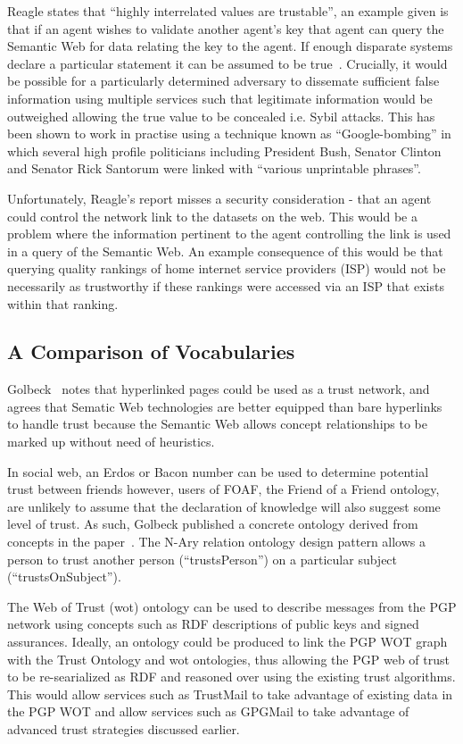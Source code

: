 \documentclass{acm_proc_article-sp}
\begin{document}
Reagle states that ``highly interrelated values are trustable'', an example given is that if an agent wishes to validate another agent's key that agent can query the Semantic Web for data relating the key to the agent.  If enough disparate systems declare a particular statement it can be assumed to be true~\cite{reagle_key_2002}. Crucially, it would be possible for a particularly determined adversary to dissemate sufficient false information using multiple services such that legitimate information would be outweighed allowing the true value to be concealed i.e. Sybil\cite{douceur_sybil_2002} attacks.  This has been shown to work in practise using a technique known as ``Google-bombing'' in which several high profile politicians including President Bush, Senator Clinton and Senator Rick Santorum were linked with ``various unprintable phrases''\cite{yourmessagehere}.

Unfortunately, Reagle's report misses a security consideration - that an agent could control the network link to the datasets on the web. This would be a problem where the information pertinent to the agent controlling the link is used in a query of the Semantic Web.   An example consequence of this would be that querying quality rankings of home internet service providers (ISP) would not be necessarily as trustworthy if these rankings were accessed via an ISP that exists within that ranking.

\subsection{A Comparison of Vocabularies}
Golbeck~\cite{golbeck} notes that hyperlinked pages could be used as a trust network, and agrees that Sematic Web technologies are better equipped than bare hyperlinks to handle trust because the Semantic Web allows concept relationships to be marked up without need of heuristics.

In social web, an Erdos or Bacon number\cite{Bacon} can be used to determine potential trust between friends however, users of FOAF, the Friend of a Friend ontology\cite{FOAF}, are unlikely to assume that the declaration of knowledge will also suggest some level of trust. As such, Golbeck published a concrete ontology derived from concepts in the paper~\cite{jennifer_golbeck_trust_2013}. The N-Ary relation ontology design pattern allows a person to trust another person (``trustsPerson'') on a particular subject (``trustsOnSubject'').

The Web of Trust (wot) ontology can be used to describe messages from the PGP network\cite{_web_2004} using concepts such as RDF descriptions of public keys and signed assurances.  Ideally, an ontology could be produced to link the PGP WOT graph with the Trust Ontology and wot ontologies, thus allowing the PGP web of trust to be re-searialized as RDF and reasoned over using the existing trust algorithms. This would allow services such as TrustMail to take advantage of existing data in the PGP WOT and allow services such as GPGMail to take advantage of advanced trust strategies discussed earlier.
\end{document}
